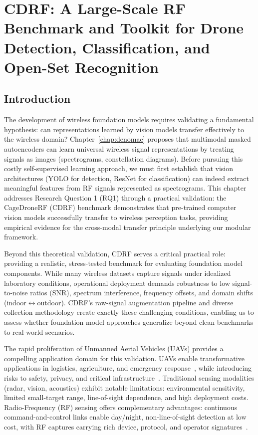 \chapter{CDRF: A Large-Scale RF Benchmark and Toolkit for Drone Detection, Classification, and Open-Set Recognition}
\label{chap:cdrf}

\section{Introduction}
\label{sec:introduction}

The development of wireless foundation models requires validating a fundamental hypothesis: can representations learned by vision models transfer effectively to the wireless domain? Chapter~\ref{chap:denomae} proposes that multimodal masked autoencoders can learn universal wireless signal representations by treating signals as images (spectrograms, constellation diagrams). Before pursuing this costly self-supervised learning approach, we must first establish that vision architectures (YOLO for detection, ResNet for classification) can indeed extract meaningful features from RF signals represented as spectrograms. This chapter addresses Research Question 1 (RQ1) through a practical validation: the CageDroneRF (CDRF) benchmark demonstrates that pre-trained computer vision models successfully transfer to wireless perception tasks, providing empirical evidence for the cross-modal transfer principle underlying our modular framework.

Beyond this theoretical validation, CDRF serves a critical practical role: providing a realistic, stress-tested benchmark for evaluating foundation model components. While many wireless datasets capture signals under idealized laboratory conditions, operational deployment demands robustness to low signal-to-noise ratios (SNR), spectrum interference, frequency offsets, and domain shifts (indoor$\leftrightarrow$outdoor). CDRF's raw-signal augmentation pipeline and diverse collection methodology create exactly these challenging conditions, enabling us to assess whether foundation model approaches generalize beyond clean benchmarks to real-world scenarios.

The rapid proliferation of Unmanned Aerial Vehicles (UAVs) provides a compelling application domain for this validation. UAVs enable transformative applications in logistics, agriculture, and emergency response~\cite{robotics12020053}, while introducing risks to safety, privacy, and critical infrastructure~\cite{nguyen2025effective}. Traditional sensing modalities (radar, vision, acoustics) exhibit notable limitations: environmental sensitivity, limited small-target range, line-of-sight dependence, and high deployment costs. Radio-Frequency (RF) sensing offers complementary advantages: continuous command-and-control links enable day/night, non-line-of-sight detection at low cost, with RF captures carrying rich device, protocol, and operator signatures~\cite{mo2022deep}.

